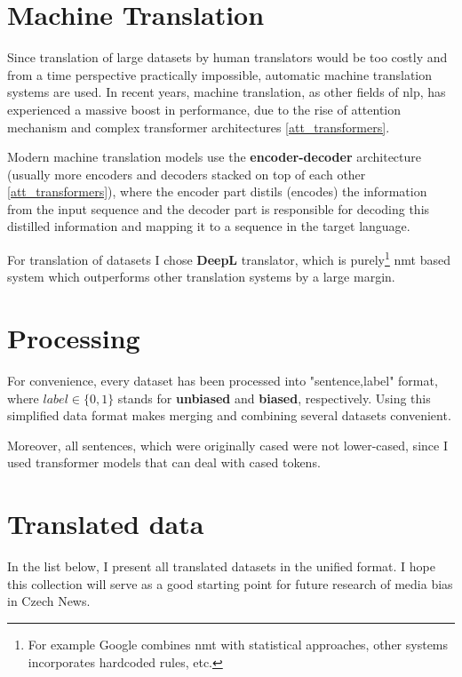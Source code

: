  
 
 
 
\section{Machine Translation}\label{DeepL}
Since translation of large datasets by human translators would be too costly and from a time perspective practically impossible, automatic machine translation systems are used. In recent years, machine translation, as other fields of \Gls{nlp}, has experienced a massive boost in performance, due to the rise of attention mechanism and complex transformer architectures \ref{att_transformers}.

Modern machine translation models use the \textbf{encoder-decoder} architecture (usually more encoders and decoders stacked on top of each other \ref{att_transformers}), where the encoder part distils (encodes) the information from the input sequence and the decoder part is responsible for decoding this distilled information and mapping it to a sequence in the target language.

For translation of datasets I chose \textbf{DeepL} translator, which is purely\footnote{For example Google combines \Gls{nmt} with statistical approaches, other systems incorporates hardcoded rules, etc.} \Gls{nmt} based system which outperforms other translation systems by a large margin.






\section{Processing}\label{processing}
For convenience, every dataset has been processed into "sentence,label" format, where $label \in \{0,1\}$ stands for \textbf{unbiased} and \textbf{biased}, respectively. Using this simplified data format makes merging and combining several datasets convenient.
    
Moreover, all sentences, which were originally cased were not lower-cased, since I used transformer models that can deal with cased tokens.

\newpage
\section{Translated data}
In the list below, I present all translated datasets in the unified format. I hope this collection will serve as a good starting point for future research of media bias in Czech News.

